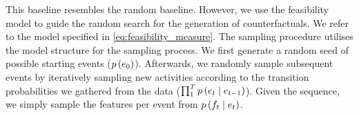 \documentclass[./../../paper.tex]{subfiles}
\begin{document}
This baseline resembles the random baseline. However, we use the feasibility model to guide the random search for the generation of counterfactuals. We refer to the model specified in \autoref{eq:feasibility_measure}. The sampling procedure utilises the model structure for the sampling process. We first generate a random seed of possible starting events ($p\left(e_0\right)$). Afterwards, we randomly sample subsequent events by iteratively sampling new activities according to the transition probabilities we gathered from the data ($\prod_1^T p\left(e_t \mid e_{t-1}\right)$). Given the sequence, we simply sample the features per event from $p\left(f_t \mid e_t\right)$. 

\end{document}
